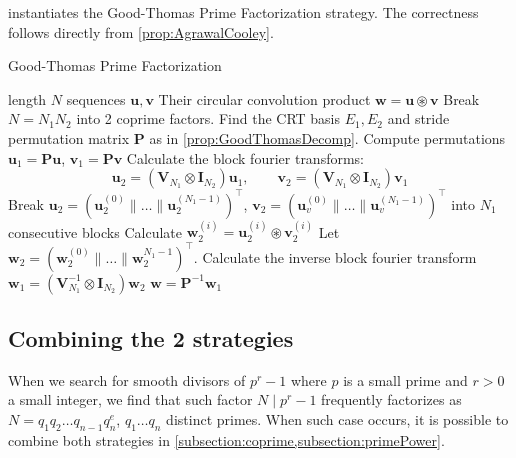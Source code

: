  instantiates the Good-Thomas Prime Factorization strategy. The correctness follows directly from \cref{prop:AgrawalCooley}.
\begin{algorithm}[ht]
    \caption{Good-Thomas Prime Factorization}\label{alg:GoodThomas}
    \begin{algorithmic}[1]
         length \(N\) sequences \(\bm{u}, \bm{v}\)
        \Ensure Their circular convolution product \(\bm{w} = \bm{u} \circledast \bm{v}\)
        \State Break \(N = N_1 N_2\) into 2 coprime factors. Find the CRT basis \(E_1, E_2\) and stride permutation matrix \(\bm{P}\) as in \cref{prop:GoodThomasDecomp}.
        \State Compute permutations \(\bm{u}_1 = \bm{P} \bm{u}\), \(\bm{v}_1 = \bm{P} \bm{v}\)
        \State Calculate the block fourier transforms:
        \[ \bm{u}_2 = \left(\bm{V}_{N_1} \otimes \bm{I}_{N_2}\right) \bm{u}_1, \qquad \bm{v}_2 = \left(\bm{V}_{N_1} \otimes \bm{I}_{N_2}\right) \bm{v}_1\] 
        \State Break \(\bm{u}_2 = (\bm{u}_2^{(0)} \parallel \ldots \parallel \bm{u}_2^{(N_1 - 1)})^{\top}\), \(\bm{v}_2 = (\bm{u}_v^{(0)} \parallel \ldots \parallel \bm{u}_v^{(N_1 - 1)})^{\top}\) into \(N_1\) consecutive blocks
            \State Calculate \(\bm{w}_2^{(i)} = \bm{u}_2^{(i)} \circledast \bm{v}_2^{(i)}\) 
        \EndFor
        \State Let \(\bm{w}_2 = (\bm{w}_2^{(0)} \parallel \ldots \parallel \bm{w}_2^{N_1 - 1})^{\top}\). Calculate the inverse block fourier transform \(\bm{w}_1 = \left(\bm{V}_{N_1}^{-1} \otimes \bm{I}_{N_2}\right) \bm{w}_2\)
         \(\bm{w} = \bm{P}^{-1} \bm{w}_1\)
    \end{algorithmic}
\end{algorithm}

\subsection{Combining the 2 strategies} \label{subsection:combination}
When we search for smooth divisors of \(p^r - 1\) where \(p\) is a small prime and \(r>0\) a small integer, we find that such factor \(N \mid p^r - 1\) frequently factorizes as \(N = q_1 q_2 \ldots q_{n-1} q_n^e\), \(q_1 \ldots q_n\) distinct primes. When such case occurs, it is possible to combine both strategies in \cref{subsection:coprime,subsection:primePower}. 


